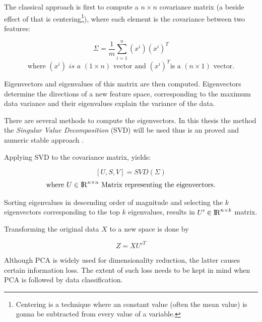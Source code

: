 The classical approach is first to compute a \(n \times n \) covariance matrix (a beside effect of that is centering\footnote{Centering is a technique where an constant value (often the mean value) is gonna be subtracted from every value of a variable.}), where each element is the covariance between two features:

\[ \Sigma = \frac{1}{m}\sum_{i = 1}^{n}(x^i)(x^i)^T\]
\[ \textrm{where }(x^i) \textit{ is a } (1 \times n) \textrm{ vector and } (x^i)^T \textrm{is a } (n \times 1) \textrm{ vector.}\]

Eigenvectors and eigenvalues of this matrix are then computed. Eigenvectors determine the directions of a new feature space, corresponding to the maximum data variance and their eigenvalues explain the variance of the data.

There are several methods to compute the eigenvectors.
In this thesis the method the \textit{Singular Value Decomposition} (SVD) will be used thus is an proved and numeric stable approach \cite{wall2003svd,zouht04}.  

Applying SVD to the covariance matrix, yields:

\[ [U,S,V] = SVD(\Sigma)\]
\[ \textrm{where  } U \in  {\rm I\!R}^{n \times n} \textrm{ Matrix representing the eigenvectors.}  \]

Sorting eigenvalues in descending order of magnitude and selecting the \( k \) eigenvectors corresponding to the top \( k \) eigenvalues, results in \( U' \in   {\rm I\!R}^{n \times k}\) matrix.

Transforming the original data \( X \) to a new space is done by

\[ Z = X U'^ T \]

Although PCA is widely used for dimensionality reduction, the latter causes certain information loss. The extent of such loss needs to be kept in mind when PCA is followed by data classification. 